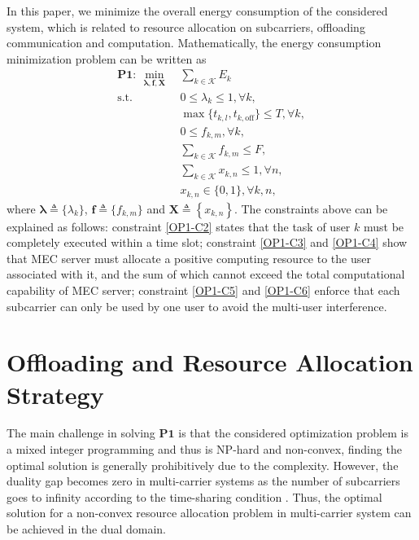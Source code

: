 \documentclass[journal]{IEEEtran}
\begin{document}
    In this paper, we minimize the overall energy consumption of the considered system, which is related to resource allocation on subcarriers, offloading communication and computation. Mathematically, the energy consumption minimization problem can be written as
    \begin{subequations}
        \label{OP1}
        \begin{align}
            \mathbf{P1}:~\min _{\boldsymbol{\lambda},\boldsymbol{f},\boldsymbol{X}}~&\sum_{k\in\mathcal{K}}E_{k}\\
            \mathrm{s.t.}  ~& 0\leq \lambda_{k}\leq 1,\forall k, \label{OP1-C1}\\
            ~&  \max \{t_{k,l}, t_{k,\text{off}}\} \leq T,\forall k,\label{OP1-C2}\\
            ~& 0 \leq f_{k,m}, \forall k,\label{OP1-C3}\\
            ~& \sum_{k\in\mathcal{K}}f_{k,m}\leq F,\label{OP1-C4}\\
            ~& \sum_{k\in\mathcal{K}}x_{k, n} \leq 1, \forall n,\label{OP1-C5}\\
            ~& x_{k, n} \in\{0,1\},\forall k, n,\label{OP1-C6}
        \end{align}
    \end{subequations}
    where $\boldsymbol{\lambda}\triangleq\{\lambda_{k}\}$, $\boldsymbol{f}\triangleq\{f_{k,m}\}$ and $\boldsymbol{X}\triangleq\left\{x_{k,n}\right\}$. The constraints above can be explained as follows: constraint \eqref{OP1-C2} states that the task of user $k$ must be completely executed within a time slot; constraint \eqref{OP1-C3} and \eqref{OP1-C4} show that MEC server must allocate a positive computing resource to the user associated with it, and the sum of which cannot exceed the total computational capability of MEC server; constraint \eqref{OP1-C5} and \eqref{OP1-C6} enforce that each subcarrier can only be used by one user to avoid the multi-user interference.
    \section{Offloading and Resource Allocation Strategy}
    The main challenge in solving $\mathbf{P1}$ is that the considered optimization problem is a mixed integer programming and thus is NP-hard and non-convex, finding the optimal solution is generally prohibitively due to the complexity. However, the duality gap becomes zero in multi-carrier systems as the number of subcarriers goes to infinity according to the time-sharing condition \cite{Seong2006Optimal,Wei2006Dual}. Thus, the optimal solution for a non-convex resource allocation problem in multi-carrier system can be achieved in the dual domain.
\end{document}
